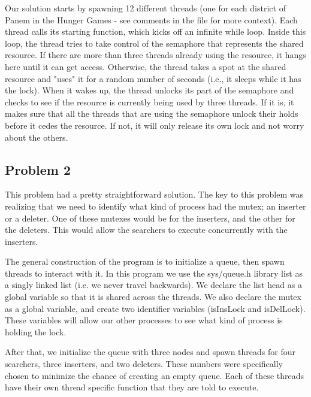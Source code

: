 \documentclass[letterpaper,10pt,titlepage]{article}
\begin{document}
Our solution starts by spawning 12 different threads (one for each district of
Panem in the Hunger Games - see comments in the file for more context).
Each thread calls its starting function, which kicks off an infinite while loop.
Inside this loop, the thread tries to take control of the semaphore that
represents the shared resource.
If there are more than three threads already using the resource, it
hangs here until it can get access.
Otherwise, the thread takes a spot at the shared resource and "uses" it for
a random number of seconds (i.e., it sleeps while it has the lock).
When it wakes up, the thread unlocks its part of the semaphore and
checks to see if the resource is currently being used by three threads.
If it is, it makes sure that all the threads that are using the semaphore
unlock their holds before it cedes the resource. If not, it will only release
its own lock and not worry about the others.

\subsection{Problem 2}
This problem had a pretty straightforward solution.
The key to this problem was realizing that we need to identify what kind of process had the mutex; an inserter or a deleter.
One of these mutexes would be for the inserters, and the other for the deleters.
This would allow the searchers to execute concurrently with the inserters.

The general construction of the program is to initialize a queue, then spawn threads to interact with it.
In this program we use the sys/queue.h library list as a singly linked list (i.e. we never travel backwards).
We declare the list head as a global variable so that it is shared across the threads.
We also declare the mutex as a global variable, and create two identifier variables (isInsLock and isDelLock).
These variables will allow our other processes to see what kind of process is holding the lock.

After that, we initialize the queue with three nodes and spawn threads for four searchers, three inserters, and two deleters.
These numbers were specifically chosen to minimize the chance of creating an empty queue.
Each of these threads have their own thread specific function that they are told to execute.
\end{document}
